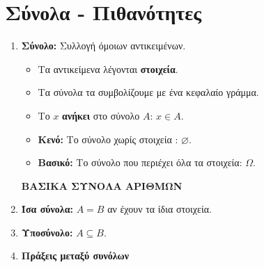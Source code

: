 \documentclass[twoside,nofonts,internet,shmeiwseis]{thewria}
\begin{document}
\section{Σύνολα - Πιθανότητες}
\begin{enumerate}
\item \textbf{Σύνολο:} Συλλογή όμοιων αντικειμένων.
\begin{itemize}[itemsep=0mm]
\item Τα αντικείμενα λέγονται \textbf{στοιχεία}.
\item Τα σύνολα τα συμβολίζουμε με ένα κεφαλαίο γράμμα.
\item Το $ x $ \textbf{ανήκει} στο σύνολο $ A $: $ x\in A $.
\item \textbf{Κενό:} Το σύνολο χωρίς στοιχεία : $ \varnothing $.
\item \textbf{Βασικό:} Το σύνολο που περιέχει όλα τα στοιχεία: $ \varOmega $.
\end{itemize}
\textbf{ΒΑΣΙΚΑ ΣΥΝΟΛΑ ΑΡΙΘΜΩΝ}
\begin{multicols}{2}
\end{multicols}
\item \textbf{Ίσα σύνολα:} $ A=B $ αν έχουν τα ίδια στοιχεία. 
\item \textbf{Υποσύνολο:} $ A\subseteq B $.
\item \textbf{Πράξεις μεταξύ συνόλων}
\end{enumerate}
\end{document}
